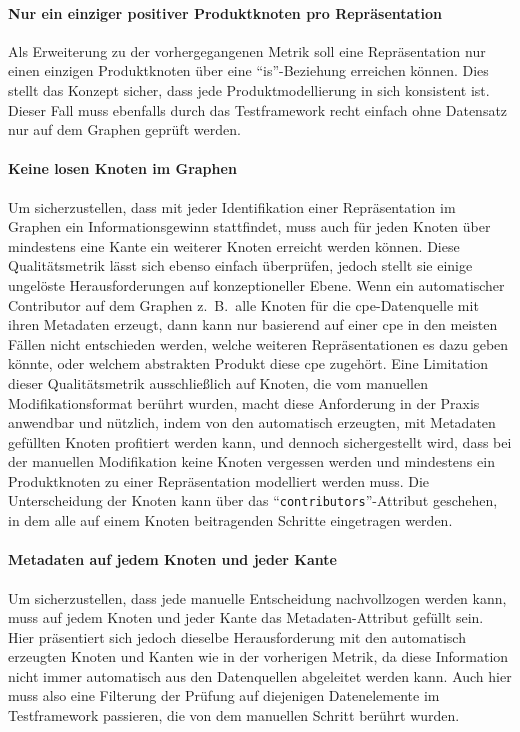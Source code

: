 \paragraph{Nur ein einziger positiver Produktknoten pro Repräsentation}
Als Erweiterung zu der vorhergegangenen Metrik soll eine Repräsentation nur einen einzigen Produktknoten über eine \enquote{is}-Beziehung erreichen können.
Dies stellt das Konzept sicher, dass jede Produktmodellierung in sich konsistent ist.
Dieser Fall muss ebenfalls durch das Testframework recht einfach ohne Datensatz nur auf dem Graphen geprüft werden.

\paragraph{Keine losen Knoten im Graphen}
Um sicherzustellen, dass mit jeder Identifikation einer Repräsentation im Graphen ein Informationsgewinn stattfindet, muss auch für jeden Knoten über mindestens eine Kante ein weiterer Knoten erreicht werden können.
Diese Qualitätsmetrik lässt sich ebenso einfach überprüfen, jedoch stellt sie einige ungelöste Herausforderungen auf konzeptioneller Ebene.
Wenn ein automatischer Contributor auf dem Graphen z.\ B.\ alle Knoten für die \acrshort{cpe}-Datenquelle mit ihren Metadaten erzeugt, dann kann nur basierend auf einer \acrshort{cpe} in den meisten Fällen nicht entschieden werden, welche weiteren Repräsentationen es dazu geben könnte, oder welchem abstrakten Produkt diese \acrshort{cpe} zugehört.
Eine Limitation dieser Qualitätsmetrik ausschließlich auf Knoten, die vom manuellen Modifikationsformat berührt wurden, macht diese Anforderung in der Praxis anwendbar und nützlich, indem von den automatisch erzeugten, mit Metadaten gefüllten Knoten profitiert werden kann, und dennoch sichergestellt wird, dass bei der manuellen Modifikation keine Knoten vergessen werden und mindestens ein Produktknoten zu einer Repräsentation modelliert werden muss.
Die Unterscheidung der Knoten kann über das \enquote{\texttt{contributors}}-Attribut geschehen, in dem alle auf einem Knoten beitragenden Schritte eingetragen werden.

\paragraph{Metadaten auf jedem Knoten und jeder Kante}
Um sicherzustellen, dass jede manuelle Entscheidung nachvollzogen werden kann, muss auf jedem Knoten und jeder Kante das Metadaten-Attribut gefüllt sein.
Hier präsentiert sich jedoch dieselbe Herausforderung mit den automatisch erzeugten Knoten und Kanten wie in der vorherigen Metrik, da diese Information nicht immer automatisch aus den Datenquellen abgeleitet werden kann.
Auch hier muss also eine Filterung der Prüfung auf diejenigen Datenelemente im Testframework passieren, die von dem manuellen Schritt berührt wurden.

